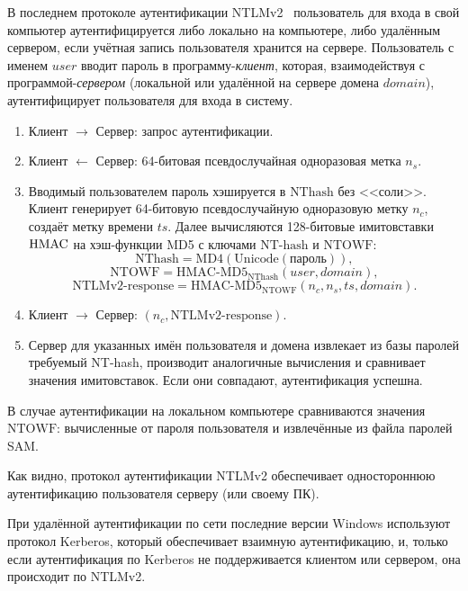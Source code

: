 В последнем протоколе аутентификации NTLMv2~\cite{MS-NLMP} пользователь для входа в свой компьютер аутентифицируется либо локально на компьютере, либо удалённым сервером, если учётная запись пользователя хранится на сервере. Пользователь с именем $user$ вводит пароль в программу-\emph{клиент}, которая, взаимодействуя с программой-\emph{сервером} (локальной или удалённой на сервере домена $domain$), аутентифицирует пользователя для входа в систему.
\begin{enumerate}
    \item Клиент $\rightarrow$ Сервер: запрос аутентификации.
    \item Клиент $\leftarrow$ Сервер: 64-битовая псевдослучайная одноразовая метка $n_s$.
    \item Вводимый пользователем пароль хэшируется в $\textrm{NThash}$ без <<соли>>. Клиент генерирует 64-битовую псевдослучайную одноразовую метку $n_c$, создаёт метку времени $ts$. Далее вычисляются 128-битовые имитовставки $\textrm{HMAC}$ на хэш-функции MD5 с ключами $\textrm{NT-hash}$ и $\textrm{NTOWF}$:
        \[ \textrm{NThash} = \text{MD4}(\text{Unicode}(\text{пароль})), \]
        \[ \textrm{NTOWF} = \textrm{HMAC-MD5}_{\textrm{NThash}}(user, domain), \]
        \[ \textrm{NTLMv2-response} = \textrm{HMAC-MD5}_{\textrm{NTOWF}}(n_c, n_s, ts, domain). \]
    \item Клиент $\rightarrow$ Сервер: $(n_c, \textrm{NTLMv2-response})$. %
    \item Сервер для указанных имён пользователя и домена извлекает из базы паролей требуемый NT-hash, производит аналогичные вычисления и сравнивает значения имитовставок. Если они совпадают, аутентификация успешна.
\end{enumerate}

В случае аутентификации на локальном компьютере сравниваются значения $\textrm{NTOWF}$: вычисленные от пароля пользователя и извлечённые из файла паролей SAM.

Как видно, протокол аутентификации NTLMv2 обеспечивает одностороннюю аутентификацию пользователя серверу (или своему ПК).

При удалённой аутентификации по сети последние версии Windows используют протокол Kerberos, который обеспечивает взаимную аутентификацию, и, только если аутентификация по Kerberos не поддерживается клиентом или сервером, она происходит по NTLMv2.
